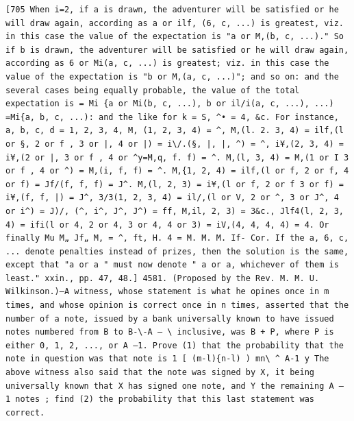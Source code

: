 \documentclass[11pt,a4paper]{book}
\begin{document}
\newpage
\setcounter{page}{588}
\begin{verbatim}
[705 When i=2, if a is drawn, the adventurer will be satisfied or he will draw again, according as a or ilf, (6, c, ...) is greatest, viz. in this case the value of the expectation is "a or M,(b, c, ...)." So if b is drawn, the adventurer will be satisfied or he will draw again, according as 6 or Mi(a, c, ...) is greatest; viz. in this case the value of the expectation is "b or M,(a, c, ...)"; and so on: and the several cases being equally probable, the value of the total expectation is = Mi {a or Mi(b, c, ...), b or il/i(a, c, ...), ...) =Mi{a, b, c, ...): and the like for k = S, ^• = 4, &c. For instance, a, b, c, d = 1, 2, 3, 4, M, (1, 2, 3, 4) = ^, M,(l. 2. 3, 4) = ilf,(l or §, 2 or f , 3 or |, 4 or |) = i\/.(§, |, |, ^) = ^, i¥,(2, 3, 4) = i¥,(2 or |, 3 or f , 4 or ^y=M,q, f. f) = ^. M,(l, 3, 4) = M,(1 or I 3 or f , 4 or ^) = M,(i, f, f) = ^. M,{1, 2, 4) = ilf,(l or f, 2 or f, 4 or f) = Jf/(f, f, f) = J^. M,(l, 2, 3) = i¥,(l or f, 2 or f 3 or f) = i¥,(f, f, |) = J^, 3/3(1, 2, 3, 4) = il/,(l or V, 2 or ^, 3 or J^, 4 or i^) = J)/, (^, i^, J^, J^) = ff, M,il, 2, 3) = 3&c., Jlf4(l, 2, 3, 4) = ifi(l or 4, 2 or 4, 3 or 4, 4 or 3) = iV,(4, 4, 4, 4) = 4. Or finally Mu M„ Jf„ M, = ^, ft, H. 4 = M. M. M. If- Cor. If the a, 6, c, ... denote penalties instead of prizes, then the solution is the same, except that "a or a " must now denote " a or a, whichever of them is least." xxin., pp. 47, 48.] 4581. (Proposed by the Rev. M. M. U. Wilkinson.)—A witness, whose statement is what he opines once in m times, and whose opinion is correct once in n times, asserted that the number of a note, issued by a bank universally known to have issued notes numbered from B to B-\-A — \ inclusive, was B + P, where P is either 0, 1, 2, ..., or A —1. Prove (1) that the probability that the note in question was that note is 1 [ (m-l){n-l) ) mn\ ^ A-1 y The above witness also said that the note was signed by X, it being universally known that X has signed one note, and Y the remaining A — 1 notes ; find (2) the probability that this last statement was correct. 
\end{verbatim}
\end{document}
